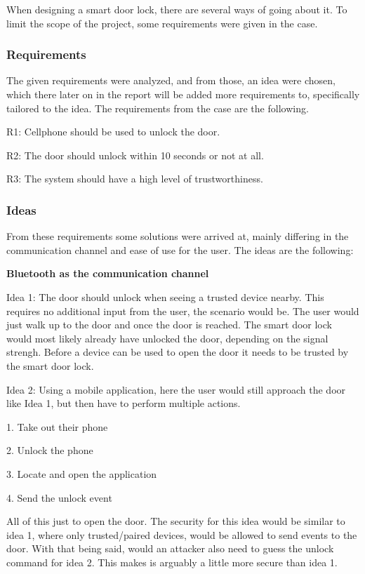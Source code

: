 When designing a smart door lock, there are several ways of going about it.
To limit the scope of the project, some requirements were given in the case.

\subsubsection{Requirements}
The given requirements were analyzed, and from those, an idea were chosen, which there later on in the report will be added more requirements to, specifically tailored to the idea.
The requirements from the case are the following.
\newline

R1: Cellphone should be used to unlock the door.

R2: The door should unlock within 10 seconds or not at all.

R3: The system should have a high level of trustworthiness.

\subsubsection{Ideas}
From these requirements some solutions were arrived at, mainly differing in the communication channel and ease of use for the user.
The ideas are the following:

\textbf{Bluetooth as the communication channel}

Idea 1: The door should unlock when seeing a trusted device nearby.
This requires no additional input from the user, the scenario would be. The user would just walk up to the door and once the door is reached.
The smart door lock would most likely already have unlocked the door, depending on the signal strengh.
Before a device can be used to open the door it needs to be trusted by the smart door lock.

Idea 2: Using a mobile application, here the user would still approach the door like Idea 1, but then have to perform multiple actions.
\newline

1. Take out their phone

2. Unlock the phone

3. Locate and open the application

4. Send the unlock event
\newline

All of this just to open the door.
The security for this idea would be similar to idea 1, where only trusted/paired devices, would be allowed to send events to the door. With that being said, would an attacker also need to guess the unlock command for idea 2. This makes is arguably a little more secure than idea 1.

